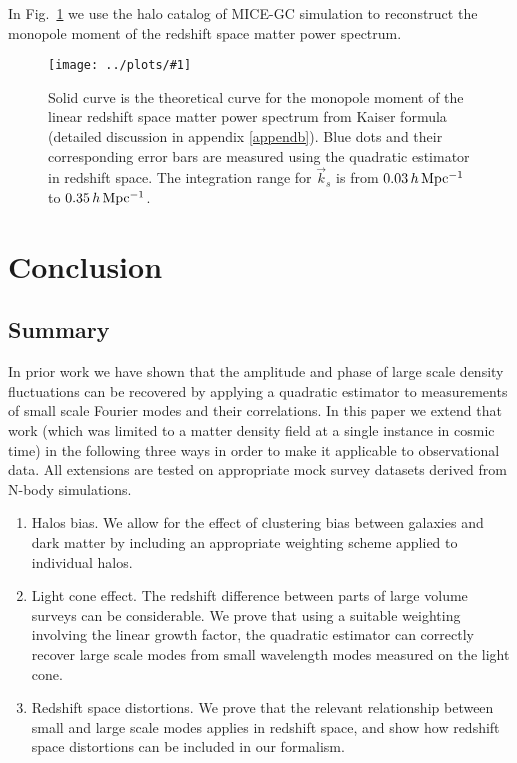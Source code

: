 \documentclass[prd,amsmath,amssymb,floatfix,superscriptaddress,nofootinbib,twocolumn]{revtex4-1}
\newcommand{\vk}{\vec{k}}
\newcommand{\rf}[1]{\ref{fig:#1}}
\newcommand{\sfig}[2]{
\texttt{[image: ../plots/\#1]}
        }
\newcommand{\Sfig}[2]{
   \begin{figure}[thbp]
   \begin{center}
    \sfig{../plots/#1.pdf}{\columnwidth}
    \caption{{\small #2}}
    \label{fig:#1}
     \end{center}
   \end{figure}
}
\begin{document}
In Fig.~\rf{SN_RS} we use the halo catalog of MICE-GC simulation to reconstruct the monopole moment of the redshift space matter power spectrum.

\Sfig{SN_RS}{Solid curve is the theoretical curve for the monopole moment of the linear redshift space matter power spectrum from Kaiser formula (detailed discussion in appendix \ref{appendb}). Blue dots and their corresponding error bars are measured using the quadratic estimator in redshift space. The integration range for $\vk_s$ is from $0.03 \,h \,\rm Mpc^{-1}$ to $0.35\,h\,\rm Mpc^{-1}$.}

\section{Conclusion} \label{sec8}
\subsection{Summary}
In prior work \cite{Li:2020fir} we have shown that the amplitude and phase of large scale density fluctuations can be recovered by applying a quadratic estimator to measurements of small scale Fourier  modes and their correlations. In this paper we extend that work (which was limited to a matter density field at a single instance in cosmic time) in the following three ways in order to make it applicable to observational data. All extensions are tested on appropriate mock survey datasets derived from N-body simulations.

\begin{enumerate}
\item  Halos bias. We allow for the effect of clustering bias between galaxies and dark matter by including an appropriate weighting scheme applied to individual halos.

\item Light cone effect. The redshift difference between parts of large volume surveys can be considerable. We prove that using a suitable weighting involving the linear growth factor, the quadratic estimator can correctly recover large scale modes from small wavelength modes measured on the light cone.

\item Redshift space distortions. We prove that the relevant relationship between small and large scale modes applies in redshift space, and show how redshift space distortions can be included in our formalism.
\end{enumerate}
 
\end{document}
